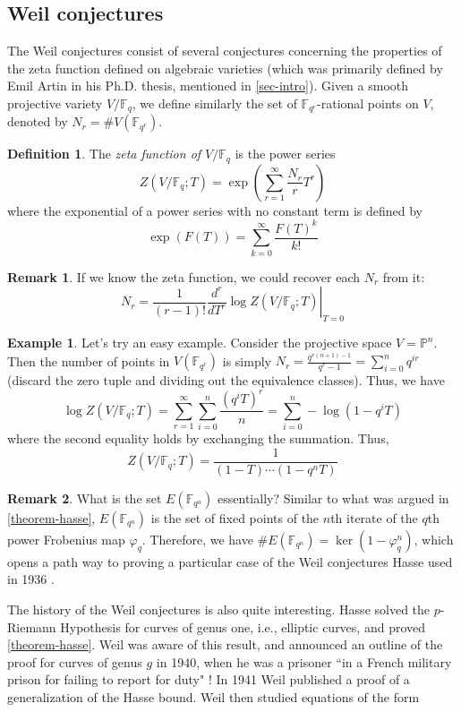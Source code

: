 \documentclass[12pt]{article}
\theoremstyle{remark}
\theoremstyle{definition}
\newtheorem{remark}{Remark}[subsection]
\newtheorem{example}{Example}[subsection]
\newtheorem{definition}{Definition}[subsection]
\newcommand{\F}[0]{\mathbb{F}}
\newcommand{\Pc}{\mathbb{P}}   %
\begin{document}
    \subsection{Weil conjectures}
        The Weil conjectures consist of several conjectures concerning the properties of the zeta function defined on algebraic varieties (which was primarily defined by Emil Artin in his Ph.D. thesis, mentioned in \autoref{sec-intro}). Given a smooth projective variety $V/\F_q$, we define similarly the set of $\F_{q^r}$-rational points on $V$, denoted by $N_r=\# V(\F_{q^r})$.
        \begin{definition}
            The \textit{zeta function of $V/\F_q$} is the power series
            \[Z(V/\F_q;T)=\exp\left(\sum_{r=1}^\infty \frac{N_r}{r}T^r\right)\]
            where the exponential of a power series with no constant term is defined by
            \[\exp(F(T))=\sum_{k=0}^\infty \frac{F(T)^k}{k!}\]
        \end{definition}
        \begin{remark}
            If we know the zeta function, we could recover each $N_r$ from it:
            \[N_r=\frac{1}{(r-1)!}\left.\frac{d^r}{dT^r}\log Z(V/\F_q;T)\right|_{T=0}\]
        \end{remark}
        \begin{example}
            Let's try an easy example. Consider the projective space $V=\Pc^n$. Then the number of points in $V(\F_{q^r})$ is simply $N_r=\frac{q^{r(n+1)-1}}{q^r-1}=\sum_{i=0}^nq^{ir}$ (discard the zero tuple and dividing out the equivalence classes). Thus, we have
            \[\log Z(V/\F_q;T)=\sum_{r=1}^\infty \sum_{i=0}^n\frac{(q^iT)^r}{n}=\sum_{i=0}^n-\log(1-q^iT)\]
            where the second equality holds by exchanging the summation. Thus,
            \[Z(V/\F_q;T)=\frac{1}{(1-T)\cdots (1-q^nT)}\]
        \end{example}
        \begin{remark}
            What is the set $E(\F_{q^n})$ essentially? Similar to what was argued in \autoref{theorem-hasse}, $E(\F_{q^n})$ is the set of fixed points of the $n$th iterate of the $q$th power Frobenius map $\varphi_{q}$. Therefore, we have $\# E(\F_{q^n})=\ker(1-\varphi_q^n)$, which opens a path way to proving a particular case of the Weil conjectures Hasse used in 1936 \cite{Hasse1936}.
        \end{remark}
        The history of the Weil conjectures is also quite interesting. Hasse solved the $p$-Riemann Hypothesis for curves of genus one, i.e., elliptic curves, and proved \autoref{theorem-hasse}. Weil was aware of this result, and announced an outline of the proof for curves of genus $g$ in 1940, when he was a prisoner ``in a French military prison for failing to report for duty" \cite{baez_2019_the}! In 1941 Weil published a proof of a generalization of the Hasse bound. Weil then studied equations of the form
\end{document}
